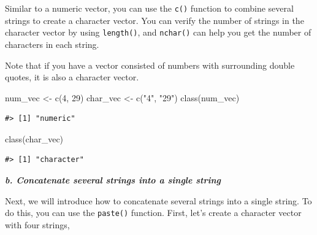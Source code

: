 \documentclass[
]{book}
\newenvironment{Shaded}{\begin{snugshade}}{\end{snugshade}}
\newcommand{\DecValTok}[1]{\textcolor[rgb]{0.00,0.00,0.81}{#1}}
\newcommand{\FunctionTok}[1]{\textcolor[rgb]{0.00,0.00,0.00}{#1}}
\newcommand{\NormalTok}[1]{#1}
\newcommand{\OtherTok}[1]{\textcolor[rgb]{0.56,0.35,0.01}{#1}}
\newcommand{\StringTok}[1]{\textcolor[rgb]{0.31,0.60,0.02}{#1}}
\begin{document}
Similar to a numeric vector, you can use the \texttt{c()} function to combine several strings to create a character vector. You can verify the number of strings in the character vector by using \texttt{length()}, and \texttt{nchar()} can help you get the number of characters in each string.

\begin{Shaded}
\end{Shaded}

Note that if you have a vector consisted of numbers with surrounding double quotes, it is also a character vector.

\begin{Shaded}
\begin{Highlighting}[]
\NormalTok{num\_vec }\OtherTok{\textless{}{-}} \FunctionTok{c}\NormalTok{(}\DecValTok{4}\NormalTok{, }\DecValTok{29}\NormalTok{)}
\NormalTok{char\_vec }\OtherTok{\textless{}{-}} \FunctionTok{c}\NormalTok{(}\StringTok{"4"}\NormalTok{, }\StringTok{"29"}\NormalTok{)}
\FunctionTok{class}\NormalTok{(num\_vec)}
\end{Highlighting}
\end{Shaded}

\begin{verbatim}
#> [1] "numeric"
\end{verbatim}

\begin{Shaded}
\begin{Highlighting}[]
\FunctionTok{class}\NormalTok{(char\_vec)}
\end{Highlighting}
\end{Shaded}

\begin{verbatim}
#> [1] "character"
\end{verbatim}

\textbf{\emph{b. Concatenate several strings into a single string}}

Next, we will introduce how to concatenate several strings into a single string. To do this, you can use the \texttt{paste()} function. First, let's create a character vector with four strings,
\end{document}

